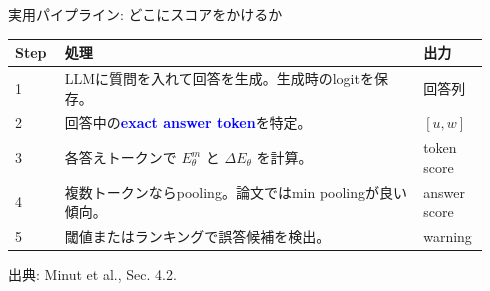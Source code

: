 \documentclass[dvipdfmx,uplatex,unicode,9pt,aspectratio=169]{beamer}
\newcommand{\key}[1]{\textcolor{Blue}{\textbf{#1}}}
\newcommand{\source}[1]{\vfill{\tiny\color{GrayText}出典: #1}}
\newcommand{\DeltaE}{\Delta E_{\theta}}
\newcommand{\Em}{E^{m}_{\theta}}
\begin{document}
\begin{frame}{実用パイプライン: どこにスコアをかけるか}
\begin{center}
\renewcommand{\arraystretch}{1.25}
\begin{tabular}{p{0.10\linewidth}p{0.72\linewidth}p{0.12\linewidth}}
\toprule
\textbf{Step} & \textbf{処理} & \textbf{出力}\\
\midrule
1 & LLMに質問を入れて回答を生成。生成時のlogitを保存。 & 回答列\\
2 & 回答中の\key{exact answer token}を特定。 & $[u,w]$\\
3 & 各答えトークンで $\Em$ と $\DeltaE$ を計算。 & token score\\
4 & 複数トークンならpooling。論文ではmin poolingが良い傾向。 & answer score\\
5 & 閾値またはランキングで誤答候補を検出。 & warning\\
\bottomrule
\end{tabular}
\end{center}
\vspace{0.6em}
\begin{center}
\end{center}
\source{Minut et al., Sec. 4.2.}
\end{frame}
\end{document}
